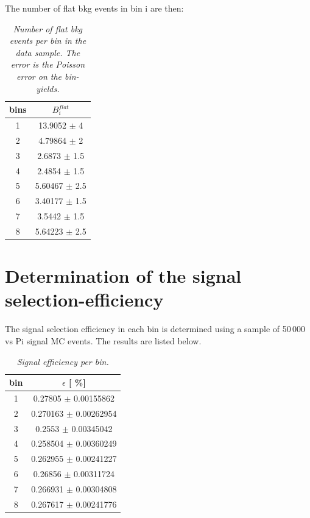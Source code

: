 The number of flat bkg events in bin i are then:
\begin{table}[!h]
	\begin{center}
		\begin{tabular}{c| c}
			bins & $B_i^{flat}$  \\
			\hline
1 & 13.9052 $\pm$ 4 \\ 
2 & 4.79864 $\pm$ 2 \\ 
3 & 2.6873 $\pm$ 1.5 \\ 
4 & 2.4854 $\pm$ 1.5 \\ 
5 & 5.60467 $\pm$ 2.5 \\ 
6 & 3.40177 $\pm$ 1.5 \\ 
7 & 3.5442 $\pm$ 1.5 \\ 
8 & 5.64223 $\pm$ 2.5 \\ 
\end{tabular}
\end{center}
\vspace*{-0.5cm}
\caption{\textit{Number of flat bkg events per bin in the data sample. The error is the Poisson error on the bin-yields.}}
\end{table} 

\section{Determination of the signal selection-efficiency}
The signal selection efficiency in each bin is determined using a sample of 50\,000 \KlPiPi vs \4Pi signal MC events. The results are listed below.
\begin{table}[!h]
	\begin{center}
		\begin{tabular}{c| c }
			bin & $\epsilon$ [ \%] \\
			\hline
1 & 0.27805 $\pm$ 0.00155862 \\ 
2 & 0.270163 $\pm$ 0.00262954 \\ 
3 & 0.2553 $\pm$ 0.00345042 \\ 
4 & 0.258504 $\pm$ 0.00360249 \\ 
5 & 0.262955 $\pm$ 0.00241227 \\ 
6 & 0.26856 $\pm$ 0.00311724 \\ 
7 & 0.266931 $\pm$ 0.00304808 \\ 
8 & 0.267617 $\pm$ 0.00241776 \\
			\end{tabular}
	\end{center}
	\vspace*{-0.5cm}
	\caption{\textit{Signal efficiency per bin.}}
\end{table} 
\clearpage

